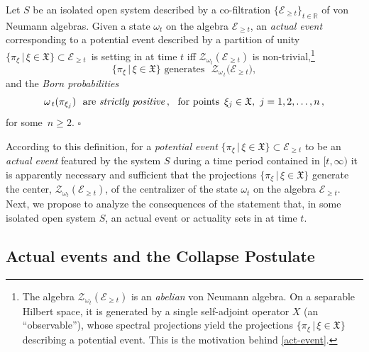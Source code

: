 \documentclass[12pt]{article}
\begin{document}
Let $S$ be an isolated open system described by a co-filtration $\big\{ \mathcal{E}_{\geq t} \big\}_{t \in \mathbb{R}}$ of von
Neumann algebras. Given a state $\omega_t$ on the algebra $\mathcal{E}_{\geq t}$, an \textit{actual event} corresponding
to a potential event described  by a partition of unity
$\big\{ \pi_{\xi}\,\vert\, \xi \in \mathfrak{X} \big\} \subset \mathcal{E}_{\geq t}$\, is setting in
 at time $t$ iff $\mathcal{Z}_{\omega_t}(\mathcal{E}_{\geq t})$ is non-trivial,\footnote{The
 algebra $\mathcal{Z}_{\omega_{t}}(\mathcal{E}_{\geq t})$ is an \textit{abelian} von Neumann algebra.
On a separable Hilbert space, it is generated by a single self-adjoint operator $X$ (an ``observable''),
whose spectral projections yield the projections $\lbrace \pi_{\xi}\,\vert \, \xi \in \mathfrak{X} \rbrace$
describing a potential event. This is the motivation behind \eqref{act-event}.}
\begin{equation}\label{act-event}
\big\{ \pi_{\xi}\,\vert \,\xi \in \mathfrak{X} \big\} \,\,\text{generates   }\,\, \mathcal{Z}_{\omega_{\,t}}\big(\mathcal{E}_{\geq t}\big),
\end{equation}
and the \textit{Born probabilities}
\begin{equation}\label{Born}
\omega_{\,t}(\pi_{\xi_{j}}) \,\,\text{ are \textit{strictly positive}}\,, \,\, \text{ for points }\,\xi_j \in \mathfrak{X}, \,\, j=1,2, \dots, n\,,
\end{equation}
for some~$n\geq 2$. \hspace{12cm}$\square$

According to this definition, for a \textit{potential event}
$\big\{\pi_{\xi}\,\vert\, \xi \in \mathfrak{X}\big\}\subset \mathcal{E}_{\geq t}$ to be an
\textit{actual event} featured by the system $S$ during a time period contained in $[t, \infty)$ it is apparently necessary
and sufficient that the projections $\big\{\pi_{\xi}\,\vert\, \xi \in \mathfrak{X}\big\}$ generate the center,
$\mathcal{Z}_{\omega_t}(\mathcal{E}_{\geq t})$, of the centralizer of the state $\omega_t$ on the algebra
$\mathcal{E}_{\geq t}$.\\

Next, we propose to analyze the consequences of the statement that, in some isolated open system $S$,
an actual event or actuality sets in at time $t$.

\subsection{Actual events and the Collapse Postulate}
\end{document}
